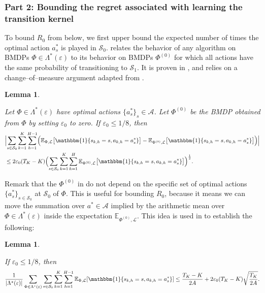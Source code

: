 \documentclass[11pt]{article}
\newcommand{\mcA}{\mathcal{A}}
\newcommand{\mcL}{\mathcal{L}}
\newcommand{\mcS}{\mathcal{S}}
\newcommand{\mbbE}{\mathbb{E}}
\newtheorem{lemma}[theorem]{Lemma}
\theoremstyle{definition}
\theoremstyle{definition}
\begin{document}
\subsubsection*{Part 2: Bounding the regret associated with learning the transition kernel}

To bound $R_0$ from below, we first upper bound the expected number of times the optimal action $a_s^*$ is played in $\mcS_0$.
 relates the behavior of any algorithm on \glspl{BMDP} $\Phi \in \Lambda^*(\varepsilon)$ to its behavior on \glspl{BMDP} $\Phi^{(0)}$ for which all actions have the same probability of transitioning to $\mcS_1$.
It is proven in , and relies on a change--of--measure argument adapted from \cite{NEURIPS2019_10a5ab2d}.

\begin{lemma}
	\label{lem:change_of_measure_argument}

	Let $\Phi \in \Lambda^*(\varepsilon)$ have optimal actions $\{a_s^*\}_{s}\in\mcA$.
	Let $\Phi^{(0)}$ be the \gls{BMDP} obtained from $\Phi$ by setting $\varepsilon_0$ to zero.
	If $\varepsilon_0\leq 1/8$, then
	\begin{align}
		 &
		\Bigl|
		\sum_{s\in\mcS_0}
		\sum_{k=1}^K
		\sum_{h=1}^{H-1}
		\Bigl(
		\mbbE_{\Phi,\mcL}
		\bigl[
			\mathbbm{1}\{s_{k,h}=s,a_{k,h}=a_s^*\}
			\bigr]
		-
		\mbbE_{\Phi^{(0)},\mcL}
		\bigl[
			\mathbbm{1}\{s_{k,h}=s,a_{k,h}=a_s^*\}
			\bigr]
		\Bigr)
		\Bigr|
		\nonumber
		\\
		 &
		\leq
		2 \varepsilon_0
		(T_K-K)
		\Bigl(
		\sum_{s\in\mcS_0}
		\sum_{k=1}^K
		\sum_{h=1}^H
		\mbbE_{\Phi^{(0)},\mcL}
		\bigl[
			\mathbbm{1}\{s_{k,h}=s,a_{k,h}=a_s^*\}
			\bigr]
		\Bigr)^{ \frac{1}{2} }
		.
		\label{eqn:change_of_measure_argument}
	\end{align}
\end{lemma}

Remark that the $\Phi^{(0)}$ in  do not depend on the specific set of optimal actions $\{a^*_s\}_{s\in\mcS_0}$ at $\mcS_0$ of $\Phi$.
This is useful for bounding $R_0$, because it means we can move the summation over $a^*\in\mcA$ implied by the arithmetic mean over $\Phi \in \Lambda^*(\varepsilon)$ inside the expectation $\mbbE_{\Phi^{(0)},\mcL}$.
This idea is used in  to establish the following:

\begin{lemma}
	\label{lem:sum_over_optimal_actions}

	If $\varepsilon_0\leq 1/8$, then
	\begin{align}
		\frac{1}{|\Lambda^*(\varepsilon)|}
		\sum_{\Phi \in \Lambda^*(\varepsilon)}
		\sum_{s\in\mcS_0}
		\sum_{k=1}^K
		\sum_{h=1}^{H-1}
		\mbbE_{\Phi,\mcL}[\mathbbm{1}\{s_{k,h}=s,a_{k,h}=a_s^*\}]
		\leq
		\frac{T_K-K}{2A}
		+
		2\varepsilon_0(T_K-K)\sqrt{\frac{T_K}{2A}}
		.
		\label{eqn:sum_over_optimal_actions}
	\end{align}
\end{lemma}
\end{document}
